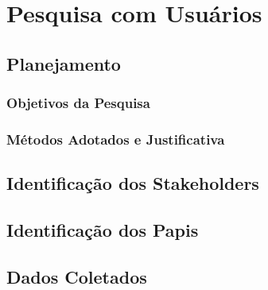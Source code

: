 \documentclass[12pt, a4paper, oneside]{abntex2}
\begin{document}
\textual

\chapter{Pesquisa com Usuários}

\section{Planejamento}
\label{sec:planejamento}
\lipsum[1]

\subsection{Objetivos da Pesquisa}
\lipsum[2]

\subsection{Métodos Adotados e Justificativa}
\lipsum[3]

\section{Identificação dos Stakeholders}
\label{sec:stakeholders}
\lipsum[4]

\section{Identificação dos Papis}
\label{sec:papeis}
\lipsum[5]

\section{Dados Coletados}
\label{sec:dados_coletados}
\lipsum[6]
\end{document}

